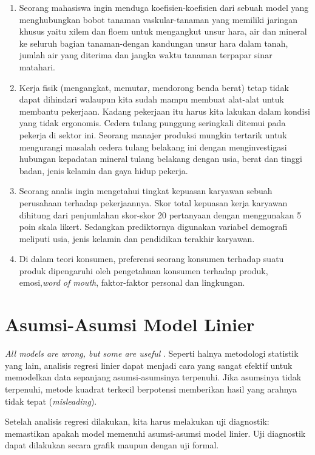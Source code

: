 \documentclass[
]{book}
\providecommand{\tightlist}{%
  \setlength{\itemsep}{0pt}\setlength{\parskip}{0pt}}
\begin{document}
\begin{enumerate}
\def\labelenumi{\arabic{enumi}.}
\tightlist
\item
  Seorang mahasiswa ingin menduga koefisien-koefisien dari sebuah
  model yang menghubungkan bobot tanaman vaskular-tanaman yang
  memiliki jaringan khusus yaitu xilem dan floem untuk mengangkut
  unsur hara, air dan mineral ke seluruh bagian tanaman-dengan
  kandungan unsur hara dalam tanah, jumlah air yang diterima dan
  jangka waktu tanaman terpapar sinar matahari.
\item
  Kerja fisik (mengangkat, memutar, mendorong benda berat) tetap tidak
  dapat dihindari walaupun kita sudah mampu membuat alat-alat untuk
  membantu pekerjaan. Kadang pekerjaan itu harus kita lakukan dalam
  kondisi yang tidak ergonomis. Cedera tulang punggung seringkali
  ditemui pada pekerja di sektor ini. Seorang manajer produksi mungkin
  tertarik untuk mengurangi masalah cedera tulang belakang ini dengan
  menginvestigasi hubungan kepadatan mineral tulang belakang dengan
  usia, berat dan tinggi badan, jenis kelamin dan gaya hidup pekerja.
\item
  Seorang analis ingin mengetahui tingkat kepuasan karyawan sebuah
  perusahaan terhadap pekerjaannya. Skor total kepuasan kerja karyawan
  dihitung dari penjumlahan skor-skor 20 pertanyaan dengan menggunakan
  5 poin skala likert. Sedangkan prediktornya digunakan variabel
  demografi meliputi usia, jenis kelamin dan pendidikan terakhir
  karyawan.
\item
  Di dalam teori konsumen, preferensi seorang konsumen terhadap suatu
  produk dipengaruhi oleh pengetahuan konsumen terhadap produk,
  emosi,\emph{word of mouth}, faktor-faktor personal dan lingkungan.
\end{enumerate}

\hypertarget{asumsi-asumsi-model-linier}{%
\section{Asumsi-Asumsi Model Linier}\label{asumsi-asumsi-model-linier}}

\emph{All models are wrong, but some are useful} \citep{box1979}. Seperti
halnya metodologi statistik yang lain, analisis regresi linier dapat
menjadi cara yang sangat efektif untuk memodelkan data sepanjang
asumsi-asumsinya terpenuhi. Jika asumsinya tidak terpenuhi, metode kuadrat
terkecil berpotensi memberikan hasil yang arahnya tidak tepat
(\emph{misleading}).

Setelah analisis regresi dilakukan, kita harus melakukan uji diagnostik:
memastikan apakah model memenuhi asumsi-asumsi model linier. Uji
diagnostik dapat dilakukan secara grafik maupun dengan uji formal.
\end{document}
